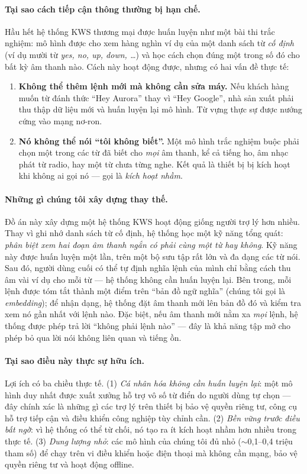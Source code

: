 \documentclass[12pt,a4paper]{report}
\begin{document}
\paragraph{Tại sao cách tiếp cận thông thường bị hạn chế.}
Hầu hết hệ thống KWS thương mại được huấn luyện như một bài thi trắc nghiệm: mô
hình được cho xem hàng nghìn ví dụ của một danh sách từ \emph{cố định} (ví dụ
mười từ \textit{yes, no, up, down, \dots}) và học cách chọn đúng một trong số đó
cho bất kỳ âm thanh nào. Cách này hoạt động được, nhưng có hai vấn đề thực tế:
\begin{enumerate}[leftmargin=1.5em,itemsep=2pt]
\item \textbf{Không thể thêm lệnh mới mà không cần sửa máy.}
Nếu khách hàng muốn từ đánh thức ``Hey Aurora'' thay vì ``Hey Google'', nhà sản
xuất phải thu thập dữ liệu mới và huấn luyện lại mô hình. Từ vựng thực sự được
nướng cứng vào mạng nơ-ron.
\item \textbf{Nó không thể nói ``tôi không biết''.} Một mô hình trắc nghiệm buộc
phải chọn một trong các từ đã biết cho \emph{mọi} âm thanh, kể cả tiếng ho, âm
nhạc phát từ radio, hay một từ chưa từng nghe. Kết quả là thiết bị bị kích hoạt
khi không ai gọi nó --- gọi là \emph{kích hoạt nhầm}.
\end{enumerate}

\paragraph{Những gì chúng tôi xây dựng thay thế.}
Đồ án này xây dựng một hệ thống KWS hoạt động giống người trợ lý hơn nhiều.
Thay vì ghi nhớ danh sách từ cố định, hệ thống học một kỹ năng tổng quát:
\emph{phân biệt xem hai đoạn âm thanh ngắn có phải cùng một từ hay không}. Kỹ
năng này được huấn luyện một lần, trên một bộ sưu tập rất lớn và đa dạng các từ
nói. Sau đó, người dùng cuối có thể tự định nghĩa lệnh của mình chỉ bằng cách thu
âm vài ví dụ cho mỗi từ --- hệ thống không cần huấn luyện lại. Bên trong, mỗi
lệnh được tóm tắt thành một điểm trên ``bản đồ ngữ nghĩa'' (chúng tôi gọi là
\emph{embedding}); để nhận dạng, hệ thống đặt âm thanh mới lên bản đồ đó và kiểm
tra xem nó gần nhất với lệnh nào. Đặc biệt, nếu âm thanh mới nằm xa \emph{mọi}
lệnh, hệ thống được phép trả lời ``không phải lệnh nào'' --- đây là khả năng tập
mở cho phép bỏ qua lời nói không liên quan và tiếng ồn.

\paragraph{Tại sao điều này thực sự hữu ích.}
Lợi ích có ba chiều thực tế. (1) \emph{Cá nhân hóa không cần huấn luyện lại}: một
mô hình duy nhất được xuất xưởng hỗ trợ vô số từ điển do người dùng tự chọn ---
đây chính xác là những gì các trợ lý trên thiết bị bảo vệ quyền riêng tư, công cụ
hỗ trợ tiếp cận và điều khiển công nghiệp tùy chỉnh cần. (2) \emph{Bền vững trước
điều bất ngờ}: vì hệ thống có thể từ chối, nó tạo ra ít kích hoạt nhầm hơn nhiều
trong thực tế. (3) \emph{Dung lượng nhỏ}: các mô hình của chúng tôi đủ nhỏ
($\sim$0{,}1--0{,}4 triệu tham số) để chạy trên vi điều khiển hoặc điện thoại mà
không cần mạng, bảo vệ quyền riêng tư và hoạt động offline.
\end{document}
